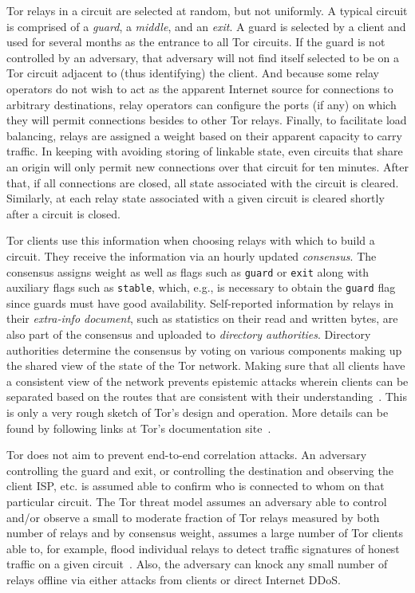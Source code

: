 Tor relays in a circuit are selected at random, but not uniformly. A typical
circuit is comprised of a \emph{guard}, a \emph{middle}, and an \emph{exit}. A
guard is selected by a client and used for several months as the entrance to all
Tor circuits. If the guard is not controlled by an adversary, that adversary
will not find itself selected to be on a Tor circuit adjacent to (thus
identifying) the client. And because some relay operators do not wish to act as
the apparent Internet source for connections to arbitrary destinations, relay
operators can configure the ports (if any) on which they will permit connections
besides to other Tor relays. Finally, to facilitate load balancing, relays are
assigned a weight based on their apparent capacity to carry traffic. In keeping
with avoiding storing of linkable state, even circuits that share an origin will
only permit new connections over that circuit for ten minutes. After that, if
all connections are closed, all state associated with the circuit is cleared.
Similarly, at each relay state associated with a given circuit is cleared
shortly after a circuit is closed.

Tor clients use this information when choosing relays with which to build a
circuit. They receive the information via an hourly updated \emph{consensus}.
The consensus assigns weight as well as flags such as \texttt{guard} or
\texttt{exit} along with auxiliary flags such as \texttt{stable}, which, e.g.,
is necessary to obtain the \texttt{guard} flag since guards must have good
availability. Self-reported information by relays in their \emph{extra-info
document}, such as statistics on their read and written bytes, are also part of
the consensus and uploaded to \emph{directory authorities}. Directory
authorities determine the consensus by voting on various components making up
the shared view of the state of the Tor network. Making sure that all clients
have a consistent view of the network prevents epistemic attacks wherein clients
can be separated based on the routes that are consistent with their
understanding~\cite{danezis:pets2008}. This is only a very rough sketch of Tor's
design and operation.  More details can be found by following links at Tor's
documentation site~\cite{tor-documentation}.

Tor does not aim to prevent end-to-end correlation attacks. An adversary
controlling the guard and exit, or controlling the destination and observing the
client ISP, etc. is assumed able to confirm who is connected to whom on that
particular circuit. The Tor threat model assumes an adversary able to control
and/or observe a small to moderate fraction of Tor relays measured by both
number of relays and by consensus weight, assumes a large number of Tor clients
able to, for example, flood individual relays to detect traffic signatures of
honest traffic on a given circuit~\cite{long-paths}. Also, the adversary can
knock any small number of relays offline via either attacks from clients or
direct Internet DDoS\@. 
